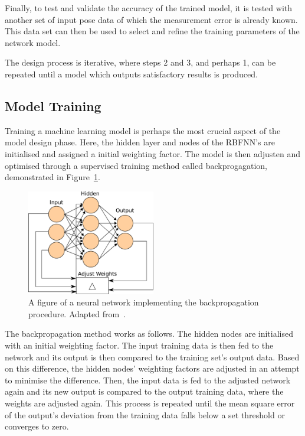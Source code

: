 Finally, to test and validate the accuracy of the trained model, it is tested with another set of input pose data of which the measurement error is already known. This data set can then be used to select and refine the training parameters of the network model. 

The design process is iterative, where steps 2 and 3, and perhaps 1, can be repeated until a model which outputs satisfactory results is produced. 

\subsection{Model Training}

Training a machine learning model is perhaps the most crucial aspect of the model design phase. Here, the hidden layer and nodes of the RBFNN's are initialised and assigned a initial weighting factor. The model is then adjusten and optimised through a supervised training method called backprogagation, demonstrated in Figure~\ref{fig:chap4-backprogagation}.

\begin{figure}
  \centering
  \includegraphics[width=0.5\textwidth]{figures/chapter4/backpropagation}
  \caption[A neural network implementing the backpropagation procedure.]{A figure of a neural network implementing the backpropagation procedure. Adapted from~\cite{ann-wiki-pic}.}
\label{fig:chap4-backprogagation}
\end{figure}

The backpropagation method works as follows. The hidden nodes are initialised with an initial weighting factor. The input training data is then fed to the network and its output is then compared to the training set's output data. Based on this difference, the hidden nodes' weighting factors are adjusted in an attempt to minimise the difference. Then, the input data is fed to the adjusted network again and its new output is compared to the output training data, where the weights are adjusted again. This process is repeated until the mean square error of the output's deviation from the training data falls below a set threshold or converges to zero. 

